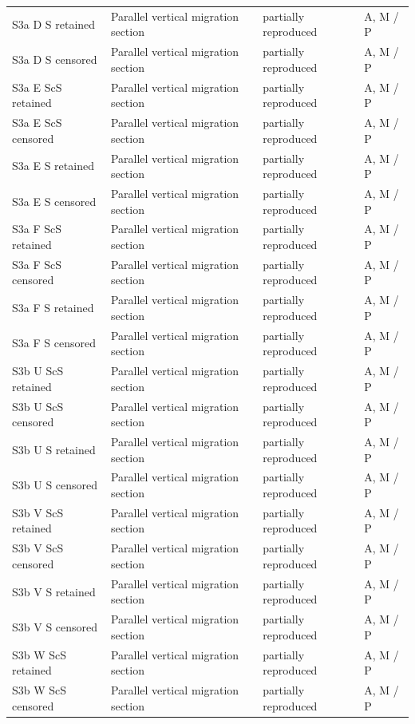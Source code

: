 \documentclass[10pt]{article}
\begin{document}
\begin{longtable}{p{.23\linewidth}p{.25\linewidth}p{.19\linewidth}p{.22\linewidth}}
S3a D S retained & Parallel vertical migration section & partially reproduced & A, M / P \\
S3a D S censored & Parallel vertical migration section & partially reproduced & A, M / P \\
S3a E ScS retained & Parallel vertical migration section & partially reproduced & A, M / P \\
S3a E ScS censored & Parallel vertical migration section & partially reproduced & A, M / P \\
S3a E S retained & Parallel vertical migration section & partially reproduced & A, M / P \\
S3a E S censored & Parallel vertical migration section & partially reproduced & A, M / P \\
S3a F ScS retained & Parallel vertical migration section & partially reproduced & A, M / P \\
S3a F ScS censored & Parallel vertical migration section & partially reproduced & A, M / P \\
S3a F S retained & Parallel vertical migration section & partially reproduced & A, M / P \\
S3a F S censored & Parallel vertical migration section & partially reproduced & A, M / P \\
S3b U ScS retained & Parallel vertical migration section & partially reproduced & A, M / P \\
S3b U ScS censored & Parallel vertical migration section & partially reproduced & A, M / P \\
S3b U S retained & Parallel vertical migration section & partially reproduced & A, M / P \\
S3b U S censored & Parallel vertical migration section & partially reproduced & A, M / P \\
S3b V ScS retained & Parallel vertical migration section & partially reproduced & A, M / P \\
S3b V ScS censored & Parallel vertical migration section & partially reproduced & A, M / P \\
S3b V S retained & Parallel vertical migration section & partially reproduced & A, M / P \\
S3b V S censored & Parallel vertical migration section & partially reproduced & A, M / P \\
S3b W ScS retained & Parallel vertical migration section & partially reproduced & A, M / P \\
S3b W ScS censored & Parallel vertical migration section & partially reproduced & A, M / P \\

\end{longtable}
\end{document}
